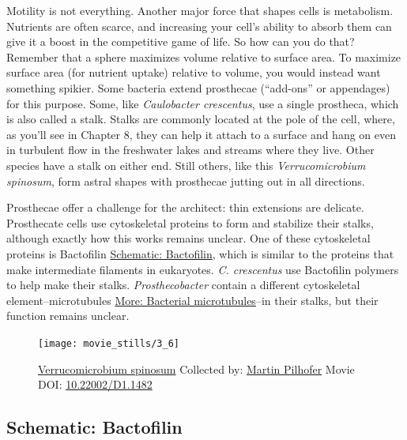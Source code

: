 \documentclass[]{tufte-book}
\begin{document}
Motility is not everything. Another major force that shapes cells is
metabolism. Nutrients are often scarce, and increasing your cell's
ability to absorb them can give it a boost in the competitive game of
life. So how can you do that? Remember that a sphere maximizes volume
relative to surface area. To maximize surface area (for nutrient uptake)
relative to volume, you would instead want something spikier. Some
bacteria extend prosthecae (``add-ons'' or appendages) for this purpose.
Some, like \emph{Caulobacter crescentus}, use a single prostheca, which
is also called a stalk. Stalks are commonly located at the pole of the
cell, where, as you'll see in Chapter 8, they can help it attach to a
surface and hang on even in turbulent flow in the freshwater lakes and
streams where they live. Other species have a stalk on either end. Still
others, like this \emph{Verrucomicrobium spinosum}, form astral shapes
with prosthecae jutting out in all directions.

Prosthecae offer a challenge for the architect: thin extensions are
delicate. Prosthecate cells use cytoskeletal proteins to form and
stabilize their stalks, although exactly how this works remains unclear.
One of these cytoskeletal proteins is Bactofilin
\protect\hyperlink{Bactofilin}{Schematic: Bactofilin}, which is similar
to the proteins that make intermediate filaments in eukaryotes. \emph{C.
crescentus} use Bactofilin polymers to help make their stalks.
\emph{Prosthecobacter} contain a different cytoskeletal
element--microtubules \protect\hyperlink{Bacterial_microtubules}{More:
Bacterial microtubules}--in their stalks, but their function remains
unclear.





\begin{figure}
\texttt{[image: movie\_stills/3\_6]} \caption[\protect\hyperlink{tree}{Verrucomicrobium spinosum} Collected
by: \protect\hyperlink{martin_pilhofer}{Martin Pilhofer} Movie DOI:
\href{https://doi.org/10.22002/D1.1482}{10.22002/D1.1482}]{\protect\hyperlink{tree}{Verrucomicrobium spinosum} Collected
by: \protect\hyperlink{martin_pilhofer}{Martin Pilhofer} Movie DOI:
\href{https://doi.org/10.22002/D1.1482}{10.22002/D1.1482}}\label{fig:3-6}
\end{figure}

\hypertarget{Bactofilin}{\subsection*{Schematic:
Bactofilin}\label{Bactofilin}}
\end{document}
